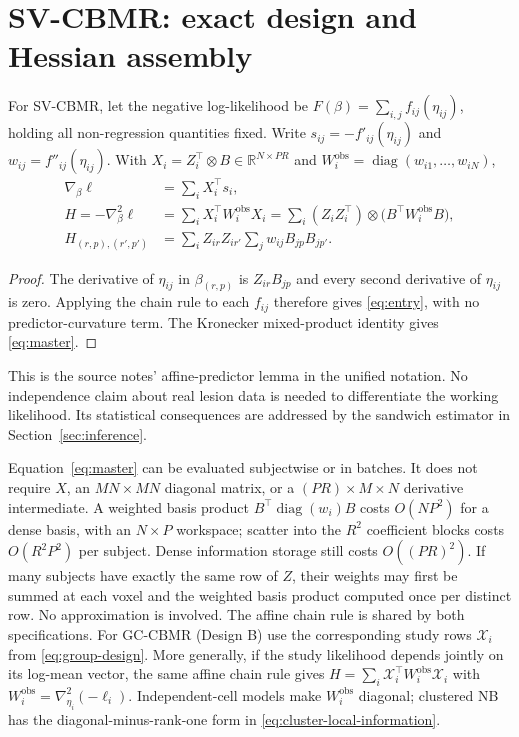 \documentclass[11pt,a4paper]{article}
\newcommand{\R}{\mathbb{R}}
\newcommand{\diag}{\operatorname{diag}}
\numberwithin{equation}{section}
\begin{document}
\section{SV-CBMR: exact design and Hessian assembly}\label{sec:master}

For SV-CBMR, let the negative log-likelihood be
$F(\beta)=\sum_{i,j}f_{ij}(\eta_{ij})$, holding all non-regression quantities
fixed. Write $s_{ij}=-f'_{ij}(\eta_{ij})$ and
$w_{ij}=f''_{ij}(\eta_{ij})$. With
$X_i=Z_i^\top\otimes B\in\R^{N\times PR}$ and
$W_i^{\mathrm{obs}}=\diag(w_{i1},\ldots,w_{iN})$,
\begin{align}
 \nabla_\beta\ell &= \sum_i X_i^\top s_i, \label{eq:score}\\
 H=-\nabla_\beta^2\ell
 &=\sum_i X_i^\top W_i^{\mathrm{obs}}X_i
 =\sum_i (Z_iZ_i^\top)\otimes
       \bigl(B^\top W_i^{\mathrm{obs}}B\bigr), \label{eq:master}\\
 H_{(r,p),(r',p')}
 &=\sum_i Z_{ir}Z_{ir'}\sum_j w_{ij}B_{jp}B_{jp'}.
 \label{eq:entry}
\end{align}
\begin{proof}
The derivative of $\eta_{ij}$ in $\beta_{(r,p)}$ is $Z_{ir}B_{jp}$
and every second derivative of $\eta_{ij}$ is zero. Applying the chain rule
to each $f_{ij}$ therefore gives \eqref{eq:entry}, with no predictor-curvature
term. The Kronecker mixed-product identity gives \eqref{eq:master}.
\end{proof}
This is the source notes' affine-predictor lemma in the unified notation.
No independence claim about real lesion data is needed to differentiate the
working likelihood. Its statistical consequences are addressed by the sandwich
estimator in Section~\ref{sec:inference}.

Equation~\eqref{eq:master} can be evaluated subjectwise or in batches. It does
not require $X$, an $MN\times MN$ diagonal matrix, or a
$(PR)\times M\times N$ derivative intermediate. A weighted basis product
$B^\top\diag(w_i)B$ costs $O(NP^2)$ for a dense basis, with an $N\times P$
workspace; scatter into the $R^2$ coefficient blocks costs $O(R^2P^2)$
per subject. Dense information storage still costs $O((PR)^2)$.
If many subjects have exactly the same row of $Z$, their weights may first be
summed at each voxel and the weighted basis product computed once per distinct
row. No approximation is involved.
The affine chain rule is shared by both specifications.
For GC-CBMR (Design B) use the corresponding study rows $\mathcal X_i$ from
\eqref{eq:group-design}. More generally, if the study likelihood depends
jointly on its log-mean vector, the same affine chain rule gives
$H=\sum_i\mathcal X_i^\top W_i^{\mathrm{obs}}\mathcal X_i$ with
$W_i^{\mathrm{obs}}=\nabla_{\eta_i}^2(-\ell_i)$.
Independent-cell models make $W_i^{\mathrm{obs}}$ diagonal; clustered NB
has the diagonal-minus-rank-one form in
\eqref{eq:cluster-local-information}.
\end{document}
